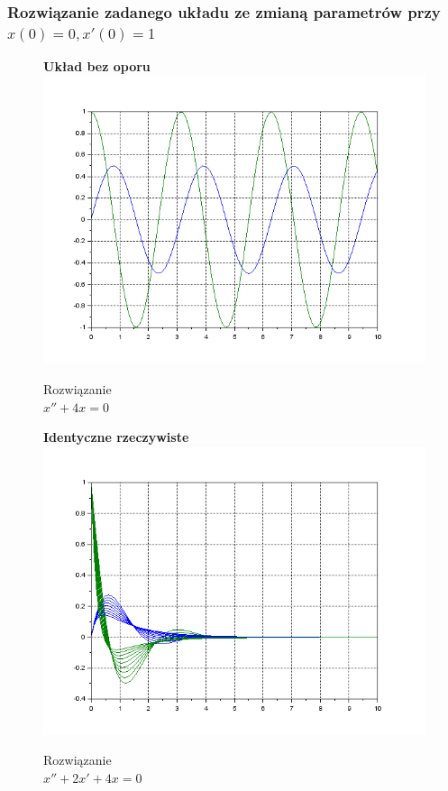 \documentclass[12pt]{article}
\begin{document}
\subsubsection{Rozwiązanie zadanego układu ze zmianą parametrów przy $x(0)=0, x'(0)=1$}

\begin{figure}[H]
  \centering
  \hspace{-1.6cm}
  \begin{minipage}[b]{0.49\textwidth}
  \centering
   \hspace{1.6cm}
   \textbf{Układ bez oporu}
    \includegraphics[scale=0.47]{./img/5-boporu-xy-01}
    \caption{Rozwiązanie \\ \centering$x''+4x=0$}
  \end{minipage}
  \hfill
  \begin{minipage}[b]{0.49\textwidth}
  \centering
  \hspace{1.6cm}
   \textbf{Identyczne rzeczywiste}
    \includegraphics[scale=0.47]{./img/5-rowne-xy-01}
    \caption{Rozwiązanie \\ \centering $x''+2x'+4x=0$}
  \end{minipage}
\end{figure}
\end{document}
